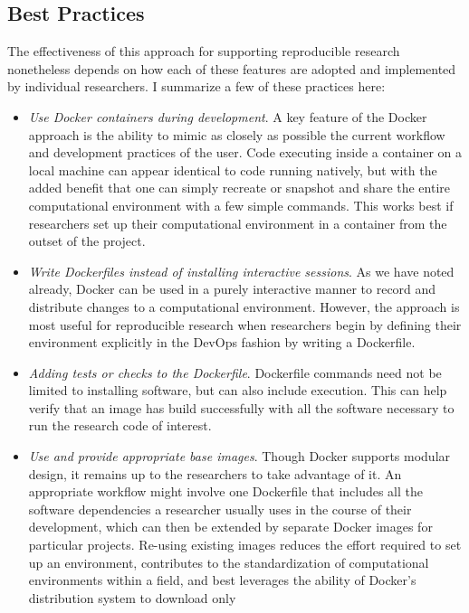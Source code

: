 \documentclass[9pt]{components/acm_proc_article-sp}
\begin{document}
\subsection{Best Practices}\label{best-practices}

The effectiveness of this approach for supporting reproducible research
nonetheless depends on how each of these features are adopted and
implemented by individual researchers. I summarize a few of these
practices here:

\begin{itemize}
\item
  \emph{Use Docker containers during development}. A key feature of the
  Docker approach is the ability to mimic as closely as possible the
  current workflow and development practices of the user. Code executing
  inside a container on a local machine can appear identical to code
  running natively, but with the added benefit that one can simply
  recreate or snapshot and share the entire computational environment
  with a few simple commands. This works best if researchers set up
  their computational environment in a container from the outset of the
  project.
\item
  \emph{Write Dockerfiles instead of installing interactive sessions}.
  As we have noted already, Docker can be used in a purely interactive
  manner to record and distribute changes to a computational
  environment. However, the approach is most useful for reproducible
  research when researchers begin by defining their environment
  explicitly in the DevOps fashion by writing a Dockerfile.
\item
  \emph{Adding tests or checks to the Dockerfile}. Dockerfile commands
  need not be limited to installing software, but can also include
  execution. This can help verify that an image has build successfully
  with all the software necessary to run the research code of interest.
\item
  \emph{Use and provide appropriate base images}. Though Docker supports
  modular design, it remains up to the researchers to take advantage of
  it. An appropriate workflow might involve one Dockerfile that includes
  all the software dependencies a researcher usually uses in the course
  of their development, which can then be extended by separate Docker
  images for particular projects. Re-using existing images reduces the
  effort required to set up an environment, contributes to the
  standardization of computational environments within a field, and best
  leverages the ability of Docker's distribution system to download only

\end{itemize}
\end{document}
